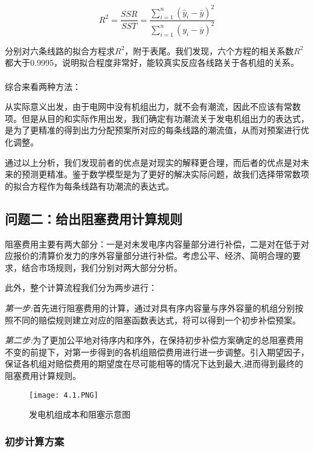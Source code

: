 \documentclass[12pt,a4paper]{ctexart}
\begin{document}
	\begin{equation} 
	R^{2}=\frac{S S R}{S S T}=\frac{\sum_{i=1}^{n}\left(\hat{y}_{i}-\bar{y}\right)^{2}}{\sum_{i=1}^{n}\left(y_{i}-\bar{y}\right)^{2}}
	\end{equation}


	分别对六条线路的拟合方程求$R^{2}$，附于表尾。我们发现，六个方程的相关系数$R^{2}$都大于0.9995，说明拟合程度非常好，能较真实反应各线路关于各机组的关系。
	~\\
	~\\
	综合来看两种方法：
	
	从实际意义出发，由于电网中没有机组出力，就不会有潮流，因此不应该有常数项。但是从目的和实际作用出发，我们确定有功潮流关于发电机组出力的表达式，是为了更精准的得到出力分配预案所对应的每条线路的潮流值，从而对预案进行优化调整。
	
	通过以上分析，我们发现前者的优点是对现实的解释更合理，而后者的优点是对未来的预测更精准。鉴于数学模型是为了更好的解决实际问题，故我们选择带常数项的拟合方程作为每条线路有功潮流的表达式。
	
	\subsection{问题二：给出阻塞费用计算规则}

阻塞费用主要有两大部分：一是对未发电序内容量部分进行补偿，二是对在低于对应报价的清算价发力的序外容量部分进行补偿。考虑公平、经济、简明合理的要求，结合市场规则，我们分别对两大部分分析。

此外，整个计算流程我们分为两步进行：

\textit{第一步:}首先进行阻塞费用的计算，通过对具有序内容量与序外容量的机组分别按照不同的赔偿规则建立对应的阻塞函数表达式，将可以得到一个初步补偿预案。

\textit{第二步:}为了更加公平地对待序内和序外，在保持初步补偿方案确定的总阻塞费用不变的前提下，对第一步得到的各机组赔偿费用进行进一步调整。引入期望因子，保证各机组对赔偿费用的期望度在尽可能相等的情况下达到最大,进而得到最终的阻塞费用计算规则。
	\begin{figure}[!h]
	\centering	%
	\texttt{[image: 4.1.PNG]} %
	\caption{发电机组成本和阻塞示意图}
\end{figure}

\subsubsection*{初步计算方案}
\end{document}

